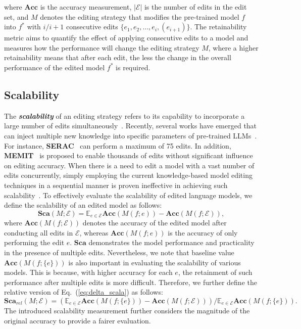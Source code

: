 \documentclass[acmsmall, screen]{acmart}
\begin{document}
where $\mathbf{Acc}$ is the accuracy measurement, $|\mathcal{E}|$ is the number of edits in the edit set, and $M$ denotes the editing strategy that modifies the pre-trained model $f$ into $f^{*}$ with $i/i+1$ consecutive edits $\{e_1,e_2,\dotsc, e_{i}, (e_{i+1})\}$. The retainability metric aims to quantify the effect of applying consecutive edits to a model and measures how the performance will change the editing strategy $M$, where a higher retainability means that after each edit, the less the change in the overall performance of the edited model $f^{*}$ is required. 

\subsection{Scalability}
The \textbf{\textit{scalability}} of an editing strategy refers to its capability to incorporate a large number of edits simultaneously~\cite{p4}.
Recently, several works have emerged that can inject multiple new knowledge into specific parameters of pre-trained LLMs~\cite{yoon2024bigger,zhang2024comprehensive}. For instance, {\textbf{SERAC}}~\cite{SERAC} can perform a maximum of 75 edits. In addition, \textbf{MEMIT}~\cite{meng2023mass} is proposed to enable thousands of edits without significant influence on editing accuracy. When there is a need to edit a model with a vast number of edits concurrently, {simply employing the current knowledge-based model editing techniques in a sequential manner is proven ineffective in achieving such scalability~\cite{yao2023editing}}. To effectively evaluate the scalability of edited language models, we define the scalability of an edited model as follows:
\begin{equation}
    \mathbf{Sca}(M;\mathcal{E})=\mathbb{E}_{e\in\mathcal{E}}\mathbf{Acc}(M(f;e)) -\mathbf{Acc}(M(f;\mathcal{E})),
    \label{eq:delta_scala}
\end{equation}
where $\mathbf{Acc}(M(f;\mathcal{E}))$ denotes the accuracy of the edited model after conducting all edits in $\mathcal{E}$, whereas $\mathbf{Acc}(M(f;e))$ is the accuracy of only performing the edit $e$. $\mathbf{Sca}$ demonstrates the model performance and practicality in the presence of multiple edits. Nevertheless, we note that baseline value $\mathbf{Acc}(M(f;\{e\}))$ is also important in evaluating the scalability of various models. This is because, with higher accuracy for each $e$, the retainment of such performance after multiple edits is more difficult. Therefore, we further define the relative version of Eq.~(\ref{eq:delta_scala}) as follows:
\begin{equation}
        \mathbf{Sca}_{rel}(M;\mathcal{E})=\left(\mathbb{E}_{e\in\mathcal{E}}\mathbf{Acc}(M(f;\{e\})) -\mathbf{Acc}(M(f;\mathcal{E}))\right)/\mathbb{E}_{e\in\mathcal{E}}\mathbf{Acc}(M(f;\{e\})).
\end{equation}
The introduced scalability measurement further considers the magnitude of the original accuracy to provide a fairer evaluation.
\end{document}
